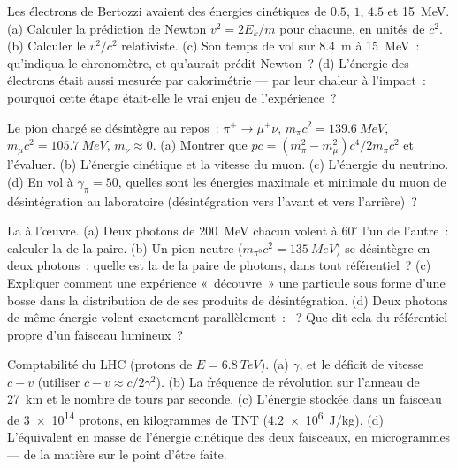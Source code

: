 \begin{exercise}[$\star\star$]\label{exo:b3:relativistic-dynamics:5}
Les électrons de Bertozzi avaient des énergies cinétiques de $0.5$,
$1$, $4.5$ et \qty{15}{MeV}. (a) Calculer la prédiction de Newton
$v^2 = 2E_k/m$ pour chacune, en unités de $c^2$. (b) Calculer le
$v^2/c^2$ relativiste. (c) Son temps de vol sur \qty{8.4}{m} à
\qty{15}{MeV}~: qu'indiqua le chronomètre, et qu'aurait prédit
Newton~? (d) L'énergie des électrons était aussi mesurée par
calorimétrie --- par leur chaleur à l'impact~: pourquoi cette étape
était-elle le vrai enjeu de l'expérience~?
\end{exercise}

\begin{exercise}[$\star\star$]\label{exo:b3:relativistic-dynamics:6}
Le pion chargé se désintègre au repos~: $\pi^+ \to \mu^+\nu$, $m_\pi c^2 =
\qty{139.6}{MeV}$, $m_\mu c^2 = \qty{105.7}{MeV}$, $m_\nu \approx 0$.
(a) Montrer que $pc = (m_\pi^2 - m_\mu^2)c^4/2m_\pi c^2$ et l'évaluer.
(b) L'énergie cinétique et la vitesse du muon. (c) L'énergie du
neutrino. (d) En vol à $\gamma_\pi = 50$, quelles sont les énergies
maximale et minimale du muon de désintégration au laboratoire
(désintégration vers l'avant et vers l'arrière)~?
\end{exercise}

\begin{exercise}[$\star\star$]\label{exo:b3:relativistic-dynamics:7}
La  à l'œuvre. (a) Deux photons de \qty{200}{MeV}
chacun volent à $60^\circ$ l'un de l'autre~: calculer la  de la paire. (b) Un pion neutre ($m_{\pi^0}c^2 = \qty{135}{MeV}$)
se désintègre en deux photons~: quelle est la  de la
paire de photons, dans tout référentiel~? (c) Expliquer comment une
expérience «~découvre~» une particule sous forme d'une bosse dans la
distribution de  de ses produits de désintégration. (d)
Deux photons de même énergie volent exactement parallèlement~: ~? Que dit cela du référentiel propre d'un faisceau lumineux~?
\end{exercise}

\begin{exercise}[$\star\star$]\label{exo:b3:relativistic-dynamics:8}
Comptabilité du LHC (protons de $E = \qty{6.8}{TeV}$). (a) $\gamma$, et
le déficit de vitesse $c - v$ (utiliser $c - v \approx c/2\gamma^2$).
(b) La fréquence de révolution sur l'anneau de \qty{27}{km} et le
nombre de tours par seconde. (c) L'énergie stockée dans un faisceau de
\num{3e14} protons, en kilogrammes de TNT (\qty{4.2e6}{J/kg}). (d)
L'équivalent en masse de l'énergie cinétique des deux faisceaux, en
microgrammes --- de la matière sur le point d'être faite.
\end{exercise}

